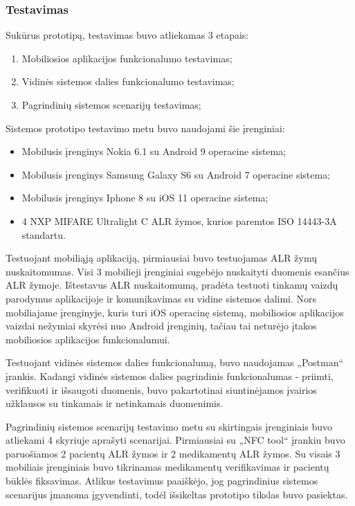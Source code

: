 \subsubsection{Testavimas}

Sukūrus prototipą, testavimas buvo atliekamas 3 etapais:
\begin{enumerate}
    \item Mobiliosios aplikacijos funkcionalumo testavimas;
    \item Vidinės sistemos dalies funkcionalumo testavimas;
    \item Pagrindinių sistemos scenarijų testavimas;
\end{enumerate}

Sistemos prototipo testavimo metu buvo naudojami šie įrenginiai:
\begin{itemize}
    \item Mobilusis įrenginys Nokia 6.1 su Android 9 operacine sistema;
    \item Mobilusis įrenginys Samsung Galaxy S6 su Android 7 operacine sistema;
    \item Mobilusis įrenginys Iphone 8 su iOS 11 operacine sistema;
    \item 4 NXP MIFARE Ultralight C ALR žymos, kurios paremtos ISO 14443-3A standartu.
\end{itemize}

Testuojant mobiliąją aplikaciją, pirmiausiai buvo testuojamas ALR žymų nuskaitomumas. Visi 3 mobilieji įrenginiai sugebėjo nuskaityti duomenis esančius ALR žymoje. Ištestavus ALR nuskaitomumą, pradėta testuoti tinkamų vaizdų parodymus aplikacijoje ir komunikavimas su vidine sistemos dalimi. Nors mobiliajame įrenginyje, kuris turi iOS operacinę sistemą, mobiliosios aplikacijos vaizdai nežymiai skyrėsi nuo Android įrenginių, tačiau tai neturėjo įtakos mobiliosios aplikacijos funkcionalumui.

Testuojant vidinės sistemos dalies funkcionalumą, buvo naudojamas „Postman“ įrankis. Kadangi vidinės sistemos dalies pagrindinis funkcionalumas - priimti, verifikuoti ir išsaugoti duomenis, buvo pakartotinai siuntinėjamos įvairios užklausos su tinkamais ir netinkamais duomenimis.

Pagrindinių sistemos scenarijų testavimo metu su skirtingais įrenginiais buvo atliekami 4 skyriuje aprašyti scenarijai. Pirmiausiai su „NFC tool“ įrankiu buvo paruošiamos 2 pacientų ALR žymos ir 2 medikamentų ALR žymos. Su visais 3 mobiliais įrenginiais buvo tikrinamas medikamentų verifikavimas ir pacientų būklės fiksavimas. Atlikus testavimus paaiškėjo, jog pagrindinius sistemos scenarijus įmanoma įgyvendinti, todėl išsikeltas prototipo tikslas buvo pasiektas.